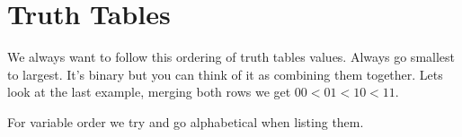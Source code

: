 \documentclass{report}
\begin{document}
\section{Truth Tables}
We always want to follow this ordering of truth tables values. Always go smallest to largest. It's binary but you can think of it as combining them together. Lets look at the last example, merging both rows we get $00 < 01 < 10 < 11$.

For variable order we try and go alphabetical when listing them.
\end{document}
